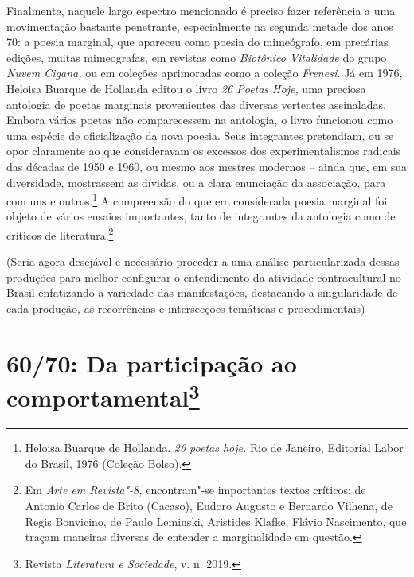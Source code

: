 Finalmente, naquele largo espectro mencionado é preciso fazer referência
a uma movimentação bastante penetrante, especialmente na segunda metade
dos anos 70: a poesia marginal, que apareceu como poesia do mimeógrafo,
em precárias edições, muitas mimeografas, em revistas como
\emph{Biotônico Vitalidade} do grupo \emph{Nuvem Cigana,} ou em coleções
aprimoradas como a coleção \emph{Frenesi.} Já em 1976, Heloisa Buarque
de Hollanda editou o livro \emph{26 Poetas Hoje,} uma preciosa antologia
de poetas marginais provenientes das diversas vertentes assinaladas.
Embora vários poetas não comparecessem na antologia, o livro funcionou
como uma espécie de oficialização da nova poesia. Seus integrantes
pretendiam, ou se opor claramente ao que consideravam os excessos dos
experimentalismos radicais das décadas de 1950 e 1960, ou mesmo aos
mestres modernos -- ainda que, em sua diversidade, mostrassem as
dívidas, ou a clara enunciação da associação, para com uns e
outros.\footnote{Heloisa Buarque de Hollanda. \emph{26 poetas hoje.} Rio
  de Janeiro, Editorial Labor do Brasil, 1976 (Coleção Bolso).} A
compreensão do que era considerada poesia marginal foi objeto de vários
ensaios importantes, tanto de integrantes da antologia como de críticos
de literatura.\footnote{Em \emph{Arte em Revista"-8,} encontram"-se
  importantes textos críticos: de Antonio Carlos de Brito (Cacaso),
  Eudoro Augusto e Bernardo Vilhena, de Regis Bonvicino, de Paulo
  Leminski, Aristides Klafke, Flávio Nascimento, que traçam maneiras
  diversas de entender a marginalidade em questão.}

\asterisc

(Seria agora desejável e necessário proceder a uma análise
particularizada dessas produções para melhor configurar o entendimento
da atividade contracultural no Brasil enfatizando a variedade das
manifestações, destacando a singularidade de cada produção, as
recorrências e intersecções temáticas e procedimentais)

\chapter*{60/70: Da participação ao comportamental\footnote{Revista
  \emph{Literatura e Sociedade}, v. n. 2019.}} %

